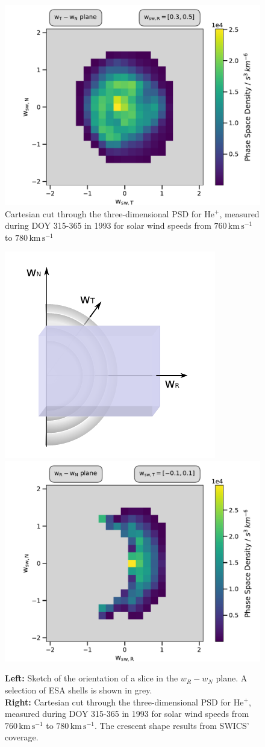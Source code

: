 \begin{figure}[h]
	\includegraphics[width=.85\textwidth]{Figures/slices_50_3.pdf}
	\centering
	\caption{Cartesian cut through the three-dimensional PSD for $\mathrm{He^{+}}$, measured during DOY 315-365 in 1993 for solar wind speeds from $760 \, \mathrm{km\,s^{-1}}$ to $780 \, \mathrm{km\,s^{-1}}$}
	\label{fig:psd_50}
\end{figure}
\begin{figure}[h]
	\includegraphics[width=.34\textwidth]{Figures/sketch_slice_T2.pdf}
	\includegraphics[width=.64\textwidth]{Figures/slice_50_T.pdf}
	\centering
	\caption{\textbf{Left:} Sketch of the orientation of a slice in the $w_R - w_N$ plane. A selection of ESA shells is shown in grey.\\ \textbf{Right:} Cartesian cut through the three-dimensional PSD for $\mathrm{He^{+}}$, measured during DOY 315-365 in 1993 for solar wind speeds from $760 \, \mathrm{km\,s^{-1}}$ to $780 \, \mathrm{km\,s^{-1}}$. The crescent shape results from SWICS' coverage.}
	\label{fig:sketch_slice_T}
\end{figure}
